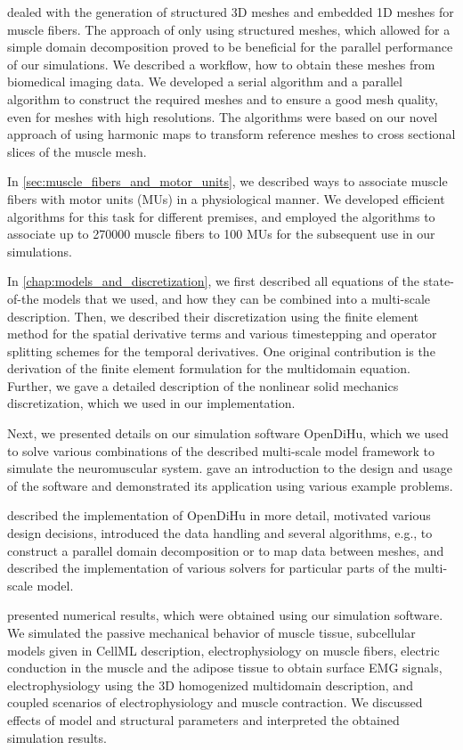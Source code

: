  dealed with the generation of structured 3D meshes and embedded 1D meshes for muscle fibers. The approach of only using structured meshes, which allowed for a simple domain decomposition proved to be beneficial for the parallel performance of our simulations.  
We described a workflow, how to obtain these meshes from biomedical imaging data. We developed a serial algorithm and a parallel algorithm to construct the required meshes and to ensure a good mesh quality, even for meshes with high resolutions. The algorithms were based on our novel approach of using harmonic maps to transform reference meshes to cross sectional slices of the muscle mesh.

In \cref{sec:muscle_fibers_and_motor_units}, we described ways to associate muscle fibers with motor units (MUs) in a physiological manner. We developed efficient algorithms for this task for different premises, and employed the algorithms to associate up to \num{270000} muscle fibers to \num{100} MUs for the subsequent use in our simulations.

In \cref{chap:models_and_discretization}, we first described all equations of the state-of-the models that we used, and how they can be combined into a multi-scale description. Then, we described their discretization using the finite element method for the spatial derivative terms and various timestepping and operator splitting schemes for the temporal derivatives. One original contribution is the derivation of the finite element formulation for the multidomain equation. Further, we gave a detailed description of the nonlinear solid mechanics discretization, which we used in our implementation.

Next, we presented details on our simulation software OpenDiHu, which we used to solve various combinations of the described multi-scale model framework to simulate the neuromuscular system.  gave an introduction to the design and usage of the software and demonstrated its application using various example problems.

 described the implementation of OpenDiHu in more detail, motivated various design decisions, introduced the data handling and several algorithms, e.g., to construct a parallel domain decomposition or to map data between meshes, and described the implementation of various solvers for particular parts of the multi-scale model.

 presented numerical results, which were obtained using our simulation software. We simulated the passive mechanical behavior of muscle tissue, subcellular models given in CellML description, electrophysiology on muscle fibers, electric conduction in the muscle and the adipose tissue to obtain surface EMG signals, electrophysiology using the 3D homogenized multidomain description, and coupled scenarios of electrophysiology and muscle contraction. We discussed effects of model and structural parameters and interpreted the obtained simulation results.

